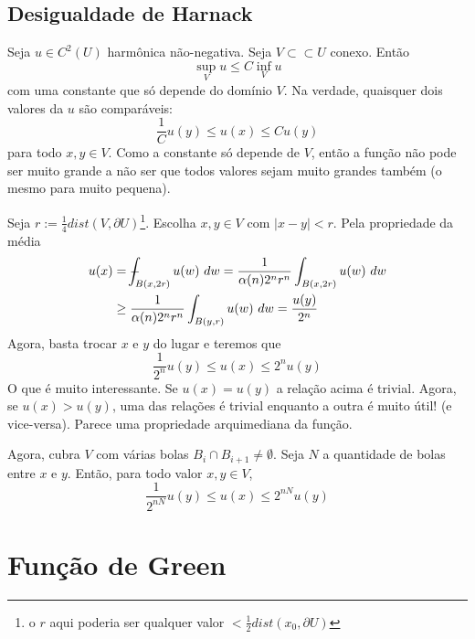\documentclass[11pt]{article}
\newcommand{\p}{\partial}
\def\Xint#1{\mathchoice
	{\XXint\displaystyle\textstyle{#1}}%
	{\XXint\textstyle\scriptstyle{#1}}%
	{\XXint\scriptstyle\scriptscriptstyle{#1}}%
	{\XXint\scriptscriptstyle\scriptscriptstyle{#1}}%
	\!\int}
\def\XXint#1#2#3{{\setbox0=\hbox{$#1{#2#3}{\int}$ }
		\vcenter{\hbox{$#2#3$ }}\kern-.6\wd0}}
\def\dashint{\Xint-}
\begin{document}
\subsection{Desigualdade de Harnack}
Seja \( u \in C^2(U) \) harmônica não-negativa. Seja \( V \subset\subset U \) conexo. Então \[ \sup_{V} u \leq C \inf_{V} u \] com uma constante que só depende do domínio \( V \). Na verdade, quaisquer dois valores da \( u \) são comparáveis: \[\frac{1}{C} u(y) \leq u(x) \leq C u(y)  \] para todo \( x,y \in V \). Como a constante só depende de \( V \), então a função não pode ser muito grande a não ser que todos valores sejam muito grandes também (o mesmo para muito pequena).

Seja \( r := \frac{1}{4}dist(V, \p U) \)\footnote{o \( r \) aqui poderia ser qualquer valor \( < \frac{1}{2}dist(x_0, \p U) \) }. Escolha \( x,y \in V\) com \(|x-y| < r \). Pela propriedade da média \begin{align*}
	u(x) &= \dashint_{B(x,2r)} u(w)\ dw = \frac{1}{\alpha (n) 2^n r^n} \int_{B(x, 2r)} u(w)\ dw \\
	&\geq \frac{1}{\alpha (n) 2^n r^n} \int_{B(y, r)} u(w)\ dw  = \frac{u(y)}{2^n}
\end{align*} Agora, basta trocar \( x \) e \( y \) do lugar e teremos que \[  \frac{1}{2^n} u(y) \leq u(x) \leq 2^n u(y)  \] O que é muito interessante. Se \( u(x) = u(y) \) a relação acima é trivial. Agora, se \( u(x) > u(y) \), uma das relações é trivial enquanto a outra é muito útil! (e vice-versa). Parece uma propriedade arquimediana da função.

Agora, cubra \(  V \) com várias bolas \( B_i \cap B_{i+1} \neq \emptyset \).
Seja \( N \) a quantidade de bolas entre \( x \) e \(  y \). Então, para todo valor \( x, y \in V \), \[  \frac{1}{2^{nN} } u(y) \leq u(x) \leq 2^{nN} u(y)  \] 





























\section{Função de Green}
\end{document}
